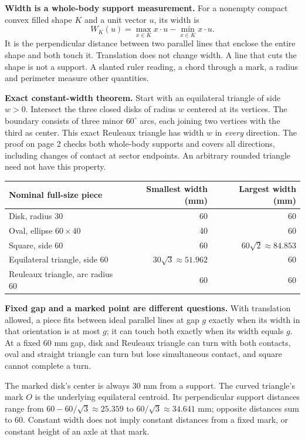 \documentclass[11pt,letterpaper]{article}
\newcommand{\heading}[1]{\par\vspace{2pt}{\large\bfseries #1}\par}
\newcommand{\lead}[1]{\textbf{#1}}
\begin{document}
\heading{Mathematical overview: the facts before the tasks}
\lead{Width is a whole-body support measurement.} For a nonempty compact convex filled shape $K$ and a unit vector $u$, its width is
\[
 W_K(u)=\max_{x\in K}x\cdot u-\min_{x\in K}x\cdot u.
\]
It is the perpendicular distance between two parallel lines that enclose the entire shape and both touch it. Translation does not change width. A line that cuts the shape is not a support. A slanted ruler reading, a chord through a mark, a radius and perimeter measure other quantities.

\lead{Exact constant-width theorem.} Start with an equilateral triangle of side $w>0$. Intersect the three closed disks of radius $w$ centered at its vertices. The boundary consists of three minor $60^\circ$ arcs, each joining two vertices with the third as center. This exact Reuleaux triangle has width $w$ in \emph{every} direction. The proof on page 2 checks both whole-body supports and covers all directions, including changes of contact at sector endpoints. An arbitrary rounded triangle need not have this property.

\begin{center}
\begin{tabular}{lrr}
\toprule Nominal full-size piece & Smallest width (mm) & Largest width (mm)\\\midrule
Disk, radius 30 & 60 & 60\\
Oval, ellipse $60\times40$ & 40 & 60\\
Square, side 60 & 60 & $60\sqrt2\approx84.853$\\
Equilateral triangle, side 60 & $30\sqrt3\approx51.962$ & 60\\
Reuleaux triangle, arc radius 60 & 60 & 60\\\bottomrule
\end{tabular}
\end{center}
\lead{Fixed gap and a marked point are different questions.} With translation allowed, a piece fits between ideal parallel lines at gap $g$ exactly when its width in that orientation is at most $g$; it can touch both exactly when its width equals $g$. At a fixed 60 mm gap, disk and Reuleaux triangle can turn with both contacts, oval and straight triangle can turn but lose simultaneous contact, and square cannot complete a turn.

The marked disk's center is always 30 mm from a support. The curved triangle's mark $O$ is the underlying equilateral centroid. Its perpendicular support distances range from $60-60/\sqrt3\approx25.359$ to $60/\sqrt3\approx34.641$ mm; opposite distances sum to 60. Constant width does not imply constant distances from a fixed mark, or constant height of an axle at that mark.
\end{document}
